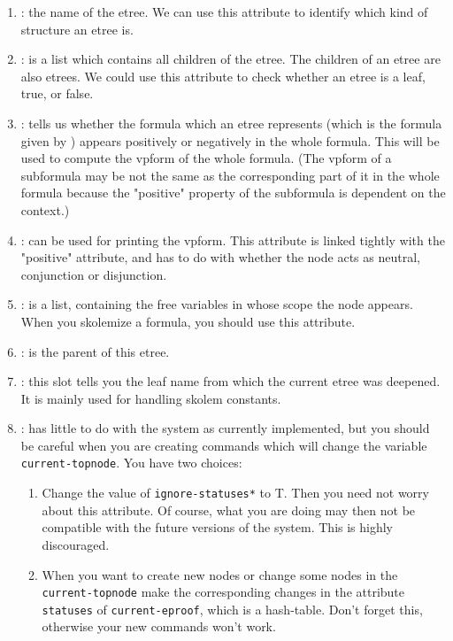 \begin{enumerate}
\item {}: the name of the etree. We can use this attribute to identify
which kind of structure an etree is.

\item {}: is a list which contains all children of the etree. 
The children of an etree are also etrees. We could use this attribute to check whether an 
etree is a leaf, true, or false. 

\item {}: 
tells us whether the formula which an etree represents (which is the formula 
given by ) appears positively or negatively in the 
whole formula. This will be used to compute the vpform of the whole formula.
(The vpform of a subformula may be not the same as the corresponding part of it 
in the whole formula because the "positive" property
of the subformula is dependent on the context.)

\item {}: can be used for printing the vpform. 
This attribute is linked tightly with the "positive" attribute, and has to do with
whether the node acts as neutral, conjunction or disjunction.

\item {}: is a list, containing the free variables in whose scope 
the node appears. When you skolemize a formula, you should use this attribute.
 
\item {}: is the parent of this etree.

\item {}: this slot tells you the leaf name from which the current
etree was deepened. It is mainly used for handling skolem constants.

\item {}: has little to do with the system as currently 
implemented, but you should be
careful when you are creating commands which will change the variable 
{\tt current-topnode}. You have two choices:
\begin{enumerate}
\item Change the value of {\tt *ignore-statuses*} to T. Then you need
not worry about this attribute. Of course,
what you are doing may then not be compatible with the future versions
of the system. This is highly discouraged.

\item When you want to create new nodes or change some nodes in the {\tt current-topnode}
make the corresponding changes in the attribute {\tt statuses} of {\tt current-eproof}, 
which is a hash-table. Don't forget this, otherwise your new commands won't work.
\end{enumerate}
\end{enumerate}

